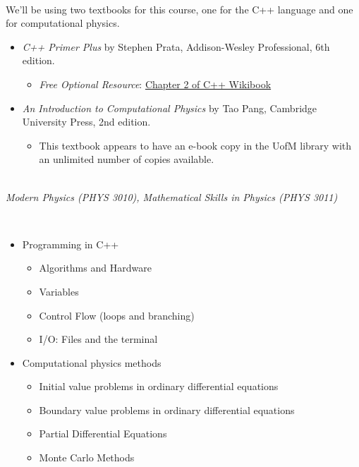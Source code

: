 \documentclass[11pt]{article}
\begin{document}
\medskip{}\\ 
We'll be using two textbooks for this course, one for the C++ language and one for computational physics.
\begin{itemize}
    \item \textit{C++ Primer Plus} by Stephen Prata, Addison-Wesley Professional, 6th edition.
    \begin{itemize}
        \item \textit{Free Optional Resource}: \href{https://en.wikibooks.org/wiki/C%2B%2B_Programming/Chapters/Fundamentals}{Chapter 2 of C++ Wikibook}
    \end{itemize}
    \item \textit{An Introduction to Computational Physics} by Tao Pang, Cambridge University Press, 2nd edition.
    \begin{itemize}
        \item This textbook appears to have an e-book copy in the UofM library with an unlimited number of copies available.
    \end{itemize}
\end{itemize}

\medskip{}\\ 
\textit{Modern Physics (PHYS 3010), Mathematical Skills in Physics (PHYS 3011)}

\medskip{}\\ 
\begin{itemize}
    \item Programming in C++
    \begin{itemize}
        \item Algorithms and Hardware
        \item Variables
        \item Control Flow (loops and branching)
        \item I/O: Files and the terminal
    \end{itemize}
    \item Computational physics methods
    \begin{itemize}
        \item Initial value problems in ordinary differential equations
        \item Boundary value problems in ordinary differential equations
        \item Partial Differential Equations
        \item Monte Carlo Methods
    \end{itemize}
\end{itemize}
\end{document}
